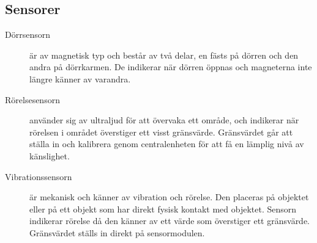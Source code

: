 \documentclass[a4paper]{article}
\begin{document}
\subsection*{Sensorer}
\begin{description}
\item[Dörrsensorn] är av magnetisk typ och består av två delar, en fästs på dörren och den andra på dörrkarmen. De indikerar när dörren öppnas och magneterna inte längre känner av varandra.
\item[Rörelsesensorn] använder sig av ultraljud för att övervaka ett område, och indikerar när rörelsen i området överstiger ett visst gränsvärde. Gränsvärdet går att ställa in och kalibrera genom centralenheten för att få en lämplig nivå av känslighet.
\item[Vibrationssensorn] är mekanisk och känner av vibration och rörelse\cite{https://www.espruino.com/Vibration}. Den placeras på objektet eller på ett objekt som har direkt fysisk kontakt med objektet. Sensorn indikerar rörelse då den känner av ett värde som överstiger ett gränsvärde. Gränsvärdet ställs in direkt på sensormodulen.
\end{description}

\textbf{}
\end{document}
